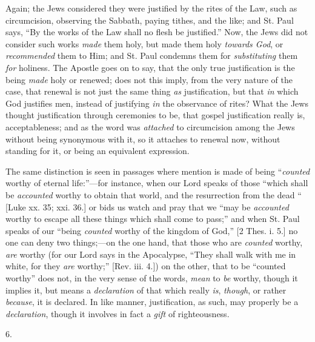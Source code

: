 Again; the Jews considered they were justified by the rites of the
Law, such as circumcision, observing the Sabbath, paying tithes, and
the like; and St. Paul says, ``By the works of the Law shall no
flesh be justified.'' Now, the Jews did not consider such
works \emph{made} them holy, but made them holy \emph{towards God}, or
\emph{recommended} them to Him; and St. Paul condemns them for \emph{substituting}
them \emph{for} holiness. The Apostle goes on to say, that the only
true justification is the being \emph{made} holy or renewed; does not
this imply, from the very nature of the case, that renewal is not just
the same thing \emph{as} justification, but that \emph{in} which God
justifies men, instead of justifying \emph{in} the observance of
rites? What the Jews thought justification through ceremonies to be,
that gospel justification really is, acceptableness; and as the word
was \emph{attached} to circumcision among the Jews without being
synonymous with it, so it attaches to renewal now, without standing
for it, or being an equivalent expression.

The same distinction is seen in passages where mention is made of
being ``\emph{counted} worthy of eternal life:''—for
instance, when our Lord speaks of those ``which shall be \emph{accounted}
worthy to obtain that world, and the resurrection from the dead ``
[Luke xx. 35; xxi. 36.] or bids us watch and pray that we ``may be
\emph{accounted} worthy to escape all these things which shall come to
pass;'' and when St. Paul speaks of our ``being \emph{counted} worthy
of the kingdom of God,'' [2 Thes. i. 5.] no one can deny two
things;—on the one hand, that those who are \emph{counted} worthy, \emph{are}
worthy (for our Lord says in the Apocalypse, ``They shall walk
with me in white, for they \emph{are} worthy;'' [Rev. iii. 4.]) on
the other, that to be ``counted worthy'' does not, in the very
sense of the words, \emph{mean} to \emph{be} worthy, though it implies
it, but means a \emph{declaration} of that which really \emph{is},
\emph{though}, or rather \emph{because}, it is declared. In like
manner, justification, as such, may properly be a \emph{declaration},
though it involves in fact a \emph{gift} of righteousness.

6.

